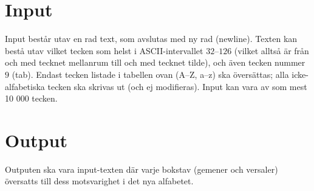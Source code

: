 \section*{Input}
Input består utav en rad text, som avslutas med ny rad (newline).
Texten kan bestå utav vilket tecken som helst i ASCII-intervallet $32$--$126$ (vilket alltså är från och med tecknet mellanrum till och med tecknet tilde), och även tecken nummer $9$ (tab).
Endast tecken listade i tabellen ovan (A--Z, a--z) ska översättas; alla icke-alfabetiska tecken ska skrivas ut (och ej modifieras).
Input kan vara av som mest 10 000 tecken.
\section*{Output}
Outputen ska vara input-texten där varje bokstav (gemener och versaler) översatts till dess motsvarighet i det nya alfabetet.
